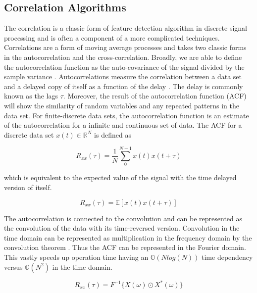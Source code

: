         \subsection{Correlation Algorithms} \label{ss:correlations}
            The correlation is a classic form of feature detection algorithm in discrete signal processing and is often a component of a more complicated techniques. Correlations are a form of moving average processes and takes two classic forms in the autocorrelation and the cross-correlation. Broadly, we are able to define the autocorrelation function as the auto-covariance of the signal divided by the sample variance \cite{hamilton_time_1994}. Autocorrelations measure the correlation between a data set and a delayed copy of itself as a function of the delay \cite{lin_selective_2008}. The delay is commonly known as the lags $\tau$. Moreover, the result of the autocorrelation function (ACF) will show the similarity of random variables and any repeated patterns in the data set. For finite-discrete data sets, the autocorrelation function is an estimate of the autocorrelation for a infinite and continuous set of data. The ACF for a discrete data set $x(t) \in \mathbb{R}^N$ is defined as
            
            \begin{equation} \label{eq:ACF}
                R_{xx}(\tau) = \frac{1}{N}\sum_{0}^{N-1} x(t)x(t+\tau)
            \end{equation}

            which is equivalent to the expected value of the signal with the time delayed version of itself.

            \[
                R_{xx}(\tau) = \mathbb{E}[x(t)x(t+\tau)]
            \]
            
            The autocorrelation is connected to the convolution and can be represented as the convolution of the data with its time-reversed version. Convolution in the time domain can be represented as multiplication in the frequency domain by the convolution theorem \cite{harris_use_1978}. Thus the ACF can be represented in the Fourier domain. This vastly speeds up operation time having an $\mathbb{O}(Nlog(N))$ time dependency versus $\mathbb{O}(N^2)$ in the time domain.

            \begin{equation} \label{eq:f_acf}
                {R}_{xx}(\tau) = F^{-1}\{X(\omega) \odot X^*(\omega)\}
            \end{equation}
            
